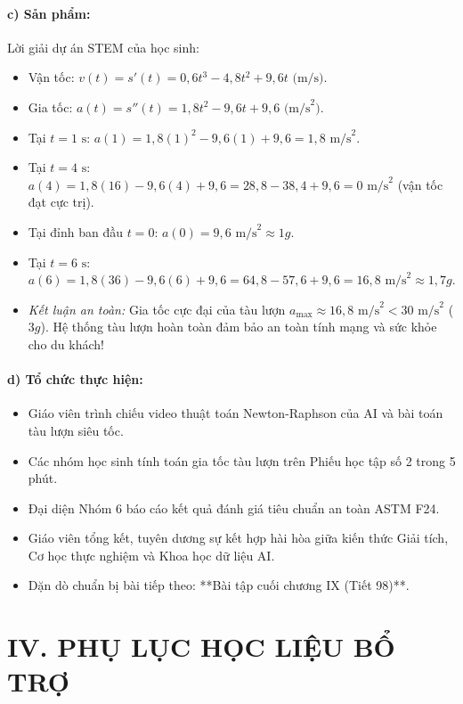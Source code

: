 \documentclass[12pt, a4paper]{article}
\begin{document}
\paragraph{c) Sản phẩm:} Lời giải dự án STEM của học sinh:
\begin{itemize}[leftmargin=0.8cm]
    \item Vận tốc: $v(t) = s'(t) = 0{,}6 t^3 - 4{,}8 t^2 + 9{,}6 t\text{ (m/s)}$.
    \item Gia tốc: $a(t) = s''(t) = 1{,}8 t^2 - 9{,}6 t + 9{,}6\text{ (m/s}^2\text{)}$.
    \item Tại $t = 1\text{ s}$: $a(1) = 1{,}8(1)^2 - 9{,}6(1) + 9{,}6 = 1{,}8\text{ m/s}^2$.
    \item Tại $t = 4\text{ s}$: $a(4) = 1{,}8(16) - 9{,}6(4) + 9{,}6 = 28{,}8 - 38{,}4 + 9{,}6 = 0\text{ m/s}^2$ (vận tốc đạt cực trị).
    \item Tại đỉnh ban đầu $t = 0$: $a(0) = 9{,}6\text{ m/s}^2 \approx 1g$.
    \item Tại $t = 6\text{ s}$: $a(6) = 1{,}8(36) - 9{,}6(6) + 9{,}6 = 64{,}8 - 57{,}6 + 9{,}6 = 16{,}8\text{ m/s}^2 \approx 1{,}7g$.
    \item \textit{Kết luận an toàn:} Gia tốc cực đại của tàu lượn $a_{\text{max}} \approx 16{,}8\text{ m/s}^2 < 30\text{ m/s}^2$ ($3g$). Hệ thống tàu lượn hoàn toàn đảm bảo an toàn tính mạng và sức khỏe cho du khách!
\end{itemize}

\paragraph{d) Tổ chức thực hiện:}
\begin{itemize}[leftmargin=0.8cm]
    \item Giáo viên trình chiếu video thuật toán Newton-Raphson của AI và bài toán tàu lượn siêu tốc.
    \item Các nhóm học sinh tính toán gia tốc tàu lượn trên Phiếu học tập số 2 trong 5 phút.
    \item Đại diện Nhóm 6 báo cáo kết quả đánh giá tiêu chuẩn an toàn ASTM F24.
    \item Giáo viên tổng kết, tuyên dương sự kết hợp hài hòa giữa kiến thức Giải tích, Cơ học thực nghiệm và Khoa học dữ liệu AI.
    \item Dặn dò chuẩn bị bài tiếp theo: **Bài tập cuối chương IX (Tiết 98)**.
\end{itemize}

\section*{IV. PHỤ LỤC HỌC LIỆU BỔ TRỢ}
\end{document}
